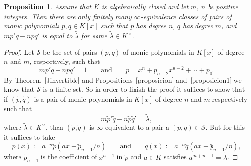 \documentclass[reqno,a4paper]{amsart}
\newtheorem{proposition}[theorem]{Proposition}
\theoremstyle{definition}
\theoremstyle{remark}
\newcommand{\wt}{\widetilde}
\begin{document}
\begin{proposition} Assume that $K$ is algebraically closed and let $m$, $n$ be
positive integers. Then there are only finitely many $\infty$-equivalence classes
of pairs of monic polynomials $p, q \in K[x]$ such that $p$ has degree $n$, $q$ has
degree $m$, and $mp'q-npq'$ is equal to $\wt{\lambda}$ for some $\wt{\lambda}\in K^{\times}$.
\end{proposition}

\begin{proof} Let $\mathcal{S}$ be the set of pairs $(p,q)$ of monic polynomials in
$K[x]$ of degree $n$ and $m$, respectively, such that
$$
mp'q-npq' = 1\qquad\text{and}\qquad p = x^n + p_{n-2} x^{n-2} + \cdots + p_0.
$$
By Theorem~\ref{Jinvertible} and Propositions~\ref{proposicion} and~\ref{proposicion1} we know
that $\mathcal{S}$ is a finite set. So in order to finish the proof it suffices to
show that if $(\tilde{p},\tilde{q})$ is a pair of monic polynomials in $K[x]$ of
degree $n$ and $m$ respectively such that
$$
m\tilde{p}'\tilde{q}-n\tilde{p}\tilde{q}'  = \wt{\lambda},
$$
where $\wt{\lambda}\in K^{\times}$, then $(\tilde{p},\tilde{q})$ is $\infty$-equivalent
to a pair a $(p,q)\in \mathcal{S}$. But for this it suffices to take
$$
p(x) := a^{-n} \tilde{p}(ax - \tilde{p}_{n-1}/n)\qquad\text{and}\qquad q(x) :=
a^{-n} \tilde{q}(ax - \tilde{p}_{n-1}/n),
$$
where $\tilde{p}_{n-1}$ is the coefficient of $x^{n-1}$ in $\tilde{p}$ and $a\in K$
satisfies $a^{m+n-1} = \wt{\lambda}$.
\end{proof}
\end{document}
